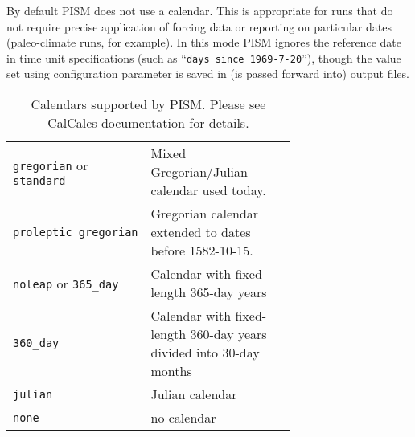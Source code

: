 By default PISM does not use a calendar. This is appropriate for runs that do not require precise application of forcing data or reporting on particular dates (paleo-climate runs, for example).  In this mode PISM ignores the reference date in time unit specifications (such as ``\texttt{days since 1969-7-20}''), though the value set using  configuration parameter is saved in (is passed forward into) output files.

\begin{table}
  \centering
  \begin{tabular}{lp{0.7\linewidth}}
    \texttt{gregorian} or \texttt{standard} & Mixed Gregorian/Julian calendar used today.\\
    \texttt{proleptic_gregorian} & Gregorian calendar extended to dates before 1582-10-15.\\
    \texttt{noleap} or \texttt{365_day} & Calendar with fixed-length 365-day years\\
    \texttt{360_day} & Calendar with fixed-length 360-day years divided into 30-day months\\
    \texttt{julian} & Julian calendar \\
    \texttt{none} & no calendar\\
  \end{tabular}
  \caption{Calendars supported by PISM. Please see \href{http://meteora.ucsd.edu/~pierce/calcalcs/calendars.html}{CalCalcs documentation} for details.}
  \label{tab:calendars}
\end{table}

